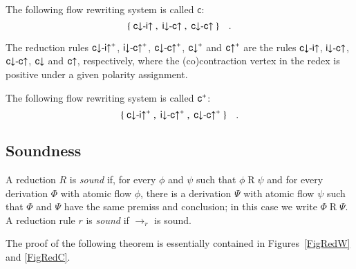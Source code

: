 \newcommand{\frc}{{\mathsf c}}
\begin{definition}
The following flow rewriting system is called $\frc$:
\[
\{\;{{\mathsf c}{\downarrow}{\hbox{-}}{\mathsf i}{\uparrow }}\;,\;{{\mathsf i}{\downarrow}{\hbox{-}}{\mathsf c}{\uparrow }}\;,\;{{\mathsf c}{\downarrow}{\hbox{-}}{\mathsf c}{\uparrow }}\;\}\quad.
\]
\end{definition}



\begin{definition}
The reduction rules $\rcdiu^\ppl$, $\ridcu^\ppl$, $\rcdcu^\ppl$, $\rcd^\ppl$ and $\rcu^\ppl$ are the rules ${{\mathsf c}{\downarrow}{\hbox{-}}{\mathsf i}{\uparrow }}$, ${{\mathsf i}{\downarrow}{\hbox{-}}{\mathsf c}{\uparrow }}$, ${{\mathsf c}{\downarrow}{\hbox{-}}{\mathsf c}{\uparrow }}$, ${\mathsf c}{\downarrow }$ and ${\mathsf c}{\uparrow }$, respectively, where the (co)contraction vertex in the redex is positive under a given polarity assignment.
\end{definition}

\newcommand{\frcp}{{\frc^\ppl}}
\begin{definition}
The following flow rewriting system is called $\frcp$:
\[
\{\;\rcdiu^\ppl\;,\;\ridcu^\ppl\;,\;\rcdcu^\ppl\;\}\quad.
\]
\end{definition}

\subsection{Soundness}

\begin{definition}
A reduction $R$ is \emph{sound} if, for every $\phi$ and $\psi$ such that $\phi\mathrel{R}\psi$ and for every derivation $\Phi$ with atomic flow $\phi$, there is a derivation $\Psi$ with atomic flow $\psi$ such that $\Phi$ and $\Psi$ have the same premiss and conclusion; in this case we write $\Phi\mathrel{R}\Psi$. A reduction rule $r$ is \emph{sound} if $\to_r$ is sound.
\end{definition}

The proof of the following theorem is essentially contained in Figures~\ref{FigRedW} and \ref{FigRedC}.

\newcommand{\ot}{\mathbin\leftarrow}

